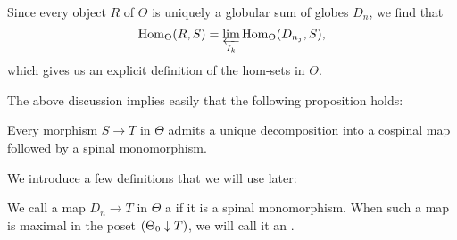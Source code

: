 Since every object \(R\) of \(\Theta\) is uniquely a globular sum of globes \(D_n\), we find that  \[{\operatorname{Hom}}_{\Theta}(R,S)=\varprojlim_{I_k}{\operatorname{Hom}}_{\Theta}(D_{n_j},S),\]
which gives us an explicit definition of the hom-sets in \(\Theta\).   

The above discussion implies easily that the following proposition holds:
\begin{prop}\label{spinalfactor} Every morphism \(S\to T\) in \(\Theta\) admits a unique decomposition into a cospinal map followed by a spinal monomorphism.
\end{prop}

We introduce a few definitions that we will use later:

\begin{defn} We call a map \(D_n\to T\) in \(\Theta\) a  if it is a spinal monomorphism.  When such a map is maximal in the poset \({(\Theta_0\downarrow T)}\), we will call it an .  
\end{defn}